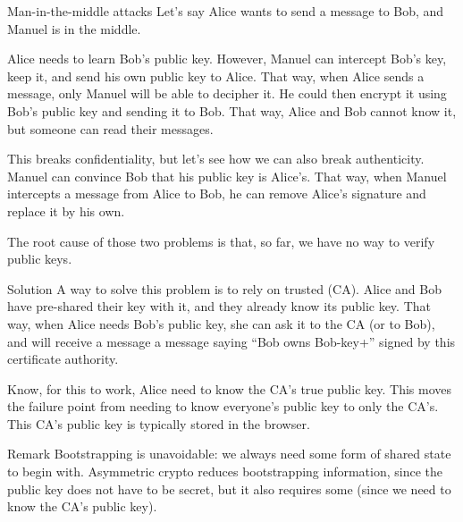 \documentclass[a4paper]{article}
\begin{document}
\begin{parag}{Man-in-the-middle attacks}
    Let's say Alice wants to send a message to Bob, and Manuel is in the middle.

    Alice needs to learn Bob's public key. However, Manuel can intercept Bob's key, keep it, and send his own public key to Alice. That way, when Alice sends a message, only Manuel will be able to decipher it. He could then encrypt it using Bob's public key and sending it to Bob. That way, Alice and Bob cannot know it, but someone can read their messages.

    This breaks confidentiality, but let's see how we can also break authenticity. Manuel can convince Bob that his public key is Alice's. That way, when Manuel intercepts a message from Alice to Bob, he can remove Alice's signature and replace it by his own.

    The root cause of those two problems is that, so far, we have no way to verify public keys.

    \begin{subparag}{Solution}
        A way to solve this problem is to rely on trusted  (CA). Alice and Bob have pre-shared their key with it, and they already know its public key. That way, when Alice needs Bob's public key, she can ask it to the CA (or to Bob), and will receive a message a message saying ``Bob owns {Bob-key+}'' signed by this certificate authority.

        Know, for this to work, Alice need to know the CA's true public key. This moves the failure point from needing to know everyone's public key to only the CA's. This CA's public key is typically stored in the browser.
    \end{subparag}
    
    \begin{subparag}{Remark}
        Bootstrapping is unavoidable: we always need some form of shared state to begin with. Asymmetric crypto reduces bootstrapping information, since the public key does not have to be secret, but it also requires some (since we need to know the CA's public key).
    \end{subparag}
\end{parag}
\end{document}
